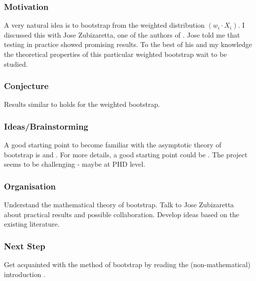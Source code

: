 \subsubsection{Motivation}
A very natural idea is to bootstrap from the weighted distribution
$
(w_i\cdot X_i)
$.
I discussed this with Jose Zubizaretta, one of the authors of \cite{Wang2019, Wang2023}.
Jose told me that testing in practice showed promising results.
To the best of his and my knowledge the theoretical properties of this particular weighted bootstrap wait to be studied.
\subsubsection{Conjecture}
Results similar to \cite[Theorem~23.5]{Vaart2000} holds for the weighted bootstrap.
\subsubsection{Ideas/Brainstorming}
A good starting point to become familiar with the asymptotic theory of bootstrap is \cite[§3.6]{vaart2013} and \cite[§23]{Vaart2000}.
For more details, a good starting point could be \cite{Barbe1995}.
The project seems to be challenging - maybe at PHD level.
\subsubsection{Organisation}
Understand the mathematical theory of bootstrap.
Talk to Jose Zubizaretta about practical results and possible collaboration.
Develop ideas based on the existing literature.
\subsubsection{Next Step}
Get acquainted with the method of bootstrap by reading the (non-mathematical) introduction \cite{Efron1994}.
